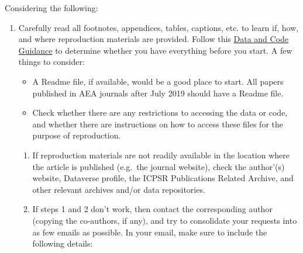 \documentclass[]{book}
\providecommand{\tightlist}{%
  \setlength{\itemsep}{0pt}\setlength{\parskip}{0pt}}
\begin{document}
Considering the following:

\begin{enumerate}
\def\labelenumi{\arabic{enumi}.}
\tightlist
\item
  Carefully read all footnotes, appendices, tables, captions, etc. to learn if, how, and where reproduction materials are provided. Follow this \href{https://social-science-data-editors.github.io/guidance/Verification_guidance.html}{Data and Code Guidance} to determine whether you have everything before you start. A few things to consider:

  \begin{itemize}
  \tightlist
  \item
    A Readme file, if available, would be a good place to start. All papers published in AEA journals after July 2019 should have a Readme file.\\
  \item
    Check whether there are any restrictions to accessing the data or code, and whether there are instructions on how to access these files for the purpose of reproduction.
  \end{itemize}

  \begin{enumerate}
  \def\labelenumii{\arabic{enumii}.}
  \setcounter{enumii}{1}
  \item
    If reproduction materials are not readily available in the location where the article is published (e.g.~the journal website), check the author'(s) website, Dataverse profile, the ICPSR Publications Related Archive, and other relevant archives and/or data repositories.
  \item
    If steps 1 and 2 don't work, then contact the corresponding author (copying the co-authors, if any), and try to consolidate your requests into as few emails as possible. In your email, make sure to include the following details:


\end{enumerate}
\end{enumerate}
\end{document}
